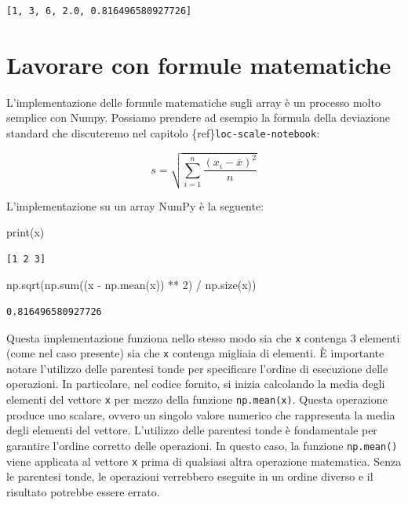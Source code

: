 \documentclass[
  letterpaper,
  krantz2]{{[}./krantz{]}}
\newenvironment{Shaded}{\begin{snugshade}}{\end{snugshade}}
\newcommand{\BuiltInTok}[1]{\textcolor[rgb]{0.00,0.23,0.31}{#1}}
\newcommand{\DecValTok}[1]{\textcolor[rgb]{0.68,0.00,0.00}{#1}}
\newcommand{\NormalTok}[1]{\textcolor[rgb]{0.00,0.23,0.31}{#1}}
\newcommand{\OperatorTok}[1]{\textcolor[rgb]{0.37,0.37,0.37}{#1}}
\begin{document}
\begin{verbatim}
[1, 3, 6, 2.0, 0.816496580927726]
\end{verbatim}

\section{Lavorare con formule
matematiche}\label{lavorare-con-formule-matematiche}

L'implementazione delle formule matematiche sugli array è un processo
molto semplice con Numpy. Possiamo prendere ad esempio la formula della
deviazione standard che discuteremo nel capitolo
\{ref\}\texttt{loc-scale-notebook}:

\[
s = \sqrt{\sum_{i=1}^n\frac{(x_i - \bar{x})^2}{n}}
\]

L'implementazione su un array NumPy è la seguente:

\begin{Shaded}
\begin{Highlighting}[]
\BuiltInTok{print}\NormalTok{(x)}
\end{Highlighting}
\end{Shaded}

\begin{verbatim}
[1 2 3]
\end{verbatim}

\begin{Shaded}
\begin{Highlighting}[]
\NormalTok{np.sqrt(np.}\BuiltInTok{sum}\NormalTok{((x }\OperatorTok{{-}}\NormalTok{ np.mean(x)) }\OperatorTok{**} \DecValTok{2}\NormalTok{) }\OperatorTok{/}\NormalTok{ np.size(x))}
\end{Highlighting}
\end{Shaded}

\begin{verbatim}
0.816496580927726
\end{verbatim}

Questa implementazione funziona nello stesso modo sia che \texttt{x}
contenga 3 elementi (come nel caso presente) sia che \texttt{x} contenga
migliaia di elementi. È importante notare l'utilizzo delle parentesi
tonde per specificare l'ordine di esecuzione delle operazioni. In
particolare, nel codice fornito, si inizia calcolando la media degli
elementi del vettore \texttt{x} per mezzo della funzione
\texttt{np.mean(x)}. Questa operazione produce uno scalare, ovvero un
singolo valore numerico che rappresenta la media degli elementi del
vettore. L'utilizzo delle parentesi tonde è fondamentale per garantire
l'ordine corretto delle operazioni. In questo caso, la funzione
\texttt{np.mean()} viene applicata al vettore \texttt{x} prima di
qualsiasi altra operazione matematica. Senza le parentesi tonde, le
operazioni verrebbero eseguite in un ordine diverso e il risultato
potrebbe essere errato.
\end{document}
